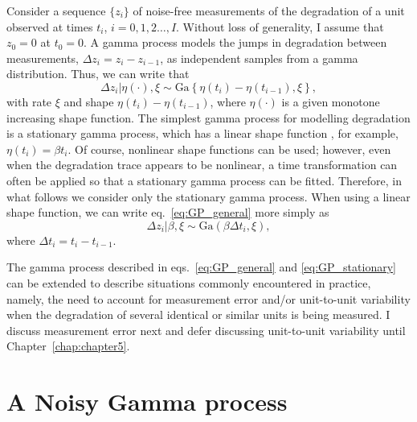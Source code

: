 Consider a sequence $\{z_i\}$ of noise-free measurements of the degradation of a unit observed at times $t_i$, $i = 0, 1, 2 \ldots, I$. Without loss of generality, I assume that $z_0 = 0$ at $t_0 = 0$. A gamma process \citep{lawless_covariates_2004} models the jumps in degradation between measurements, $\Delta z_i = z_i - z_{i-1}$, as independent samples from a gamma distribution. Thus, we can write that
\begin{equation} \label{eq:GP_general}
    \Delta z_i|\eta(\cdot), \xi \sim \mbox{Ga} \left\{ \eta(t_i) - \eta(t_{i-1}), \xi \right\},
\end{equation}
with rate $\xi$ and shape $\eta(t_i) - \eta(t_{i-1})$, where $\eta(\cdot)$ is a given monotone increasing shape function. The simplest gamma process for modelling degradation is a stationary gamma process, which has a linear shape function \citep{frenk:2007}, for example, $\eta(t_i) = \beta t_i$. Of course, nonlinear shape functions can be used; however, even when the degradation trace appears to be nonlinear, a time transformation can often be applied so that a stationary gamma process can be fitted. Therefore, in what follows we consider only the stationary gamma process. When using a linear shape function, we can write eq.~\ref{eq:GP_general} more simply as
\begin{equation} \label{eq:GP_stationary}
    \Delta z_i| \beta, \xi \sim \mbox{Ga} \left( \beta \Delta t_i, \xi \right),
\end{equation}
where $\Delta t_i = t_i - t_{i-1}$.

The gamma process described in eqs.~\ref{eq:GP_general} and \ref{eq:GP_stationary} can be extended to describe situations commonly encountered in practice, namely, the need to account for measurement error and/or unit-to-unit variability when the degradation of several identical or similar units is being measured. I discuss measurement error next and defer discussing unit-to-unit variability until Chapter~\ref{chap:chapter5}.

\section{A Noisy Gamma process}

